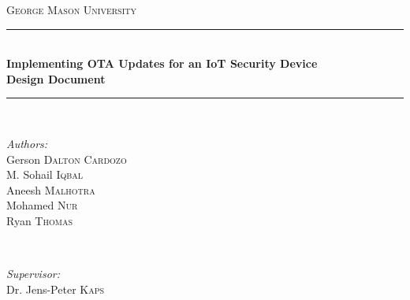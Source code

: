\documentclass[11pt]{article}
\begin{document}
\begin{titlepage}

\newcommand{\HRule}{\rule{\linewidth}{0.5mm}} %

\center %
 

\textsc{\LARGE George Mason University}\\[1.5cm] %



\HRule \\[0.4cm]
{ \huge \bfseries Implementing OTA Updates for an IoT Security Device}\\[0.4cm] %
\LARGE{\textbf{Design Document}}
\HRule \\[1.5cm]
 
\begin{minipage}{0.4\textwidth}
\begin{flushleft} \large
\emph{Authors:}\\
Gerson \textsc{Dalton Cardozo} \\
M. Sohail \textsc{Iqbal} \\ 
Aneesh \textsc{Malhotra} \\ 
Mohamed \textsc{Nur} \\ 
Ryan \textsc{Thomas} %
\end{flushleft}
\end{minipage}
~
\begin{minipage}{0.4\textwidth}
\begin{flushright} \large
\emph{Supervisor:} \\
Dr. Jens-Peter \textsc{Kaps} %
\end{flushright}
\end{minipage}\\[2cm]



\end{titlepage}
\end{document}
